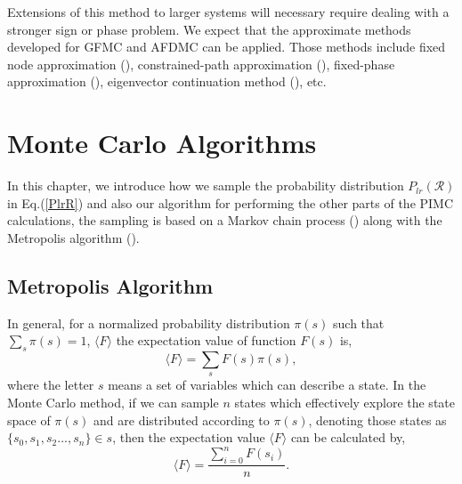 \documentclass[12pt,letterpaper,UTF8]{report}
\begin{document}
Extensions of this method to larger systems will necessary require dealing
with a stronger sign or phase problem. We expect that the approximate
methods developed for GFMC and AFDMC can be applied.
Those methods include fixed node approximation (\cite{Moskowitz1982a,JBAnderson2008}), constrained-path approximation (\cite{ZhangShiwei2003PRL,Gandolfi2009PRCa,Motta2018}), fixed-phase approximation (\cite{Carlson87a}), eigenvector continuation method (\cite{DLee2018PRL}), etc.






























\chapter{Monte Carlo Algorithms}
\label{compalgorithm}

In this chapter, we introduce how we sample the probability distribution $P_{lr}(\mathcal{R})$ in Eq.(\ref{PlrR}) and also our algorithm for performing the other parts of the PIMC calculations, the sampling is based on a Markov chain process (\cite{Ceperley95a,HammondMCbook}) along with the Metropolis algorithm (\cite{Metropolis53a,Kalos1986a}).
\\

\section{Metropolis Algorithm}
\label{MarkovChian}

In general, for a normalized probability distribution $\pi(s)$ such that $\sum_s \pi(s)=1$, $\langle F \rangle$ the expectation value of function $F(s)$ is,
\begin{equation}
\langle F \rangle = \sum_s F(s) \pi(s),
\label{Fave}
\end{equation}
where the letter $s$ means a set of variables which can describe a state. In the Monte Carlo method, if we can sample $n$ states which effectively explore the state space of $\pi(s)$ and are distributed according to $\pi(s)$, denoting those states as $\{s_0,s_1,s_2...,s_n\} \in s $, then the expectation value $\langle F \rangle$ can be calculated by,
\begin{equation}
\langle F \rangle = \frac{\sum_{i=0}^n F(s_i) }{n} .
\label{FaveMC}
\end{equation}
\end{document}
